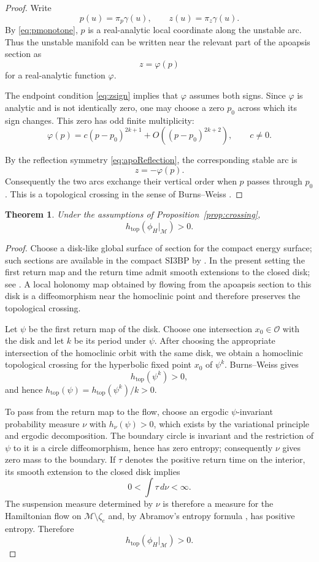 \documentclass[11pt]{article}
\newtheorem{theorem}{Theorem}[section]
\newcommand{\cM}{\mathcal M}
\newcommand{\cO}{\mathcal O}
\newcommand{\htop}{h_{\mathrm{top}}}
\begin{document}
\begin{proof}
Write
\[
 p(u)=\pi_p\gamma(u),\qquad
 z(u)=\pi_z\gamma(u).
\]
By \eqref{eq:pmonotone}, $p$ is a real-analytic local coordinate along the
unstable arc.  Thus the unstable manifold can be written near the relevant
part of the apoapsis section as
\[
 z=\varphi(p)
\]
for a real-analytic function $\varphi$.

The endpoint condition \eqref{eq:zsign} implies that $\varphi$ assumes both
signs.  Since $\varphi$ is analytic and is not identically zero, one may
choose a zero $p_0$ across which its sign changes.  This zero has odd finite
multiplicity:
\[
 \varphi(p)
 =
 c(p-p_0)^{2k+1}
 +O((p-p_0)^{2k+2}),
 \qquad c\ne0.
\]

By the reflection symmetry \eqref{eq:apoReflection}, the corresponding
stable arc is
\[
 z=-\varphi(p).
\]
Consequently the two arcs exchange their vertical order when $p$ passes
through $p_0$.  This is a topological crossing in the sense of
Burns--Weiss \cite{BurnsWeiss}.
\end{proof}

\begin{theorem}\label{thm:entropyfromcrossing}
Under the assumptions of Proposition~\ref{prop:crossing},
\[
 \htop(\phi_H|_{\cM})>0.
\]
\end{theorem}

\begin{proof}
Choose a disk-like global surface of section for the compact energy
surface; such sections are available in the compact SI3BP by
\cite{HuLiuOuSalomaoYu}.  In the present setting the first return map and the
return time admit smooth extensions to the closed disk; see
\cite[Propositions~4.1--4.2]{ECHconstraints}.  A local holonomy map obtained
by flowing from the apoapsis section to this disk is a diffeomorphism near
the homoclinic point and therefore preserves the topological crossing.

Let $\psi$ be the first return map of the disk.  Choose one intersection
$x_0\in\cO$ with the disk and let $k$ be its period under $\psi$.  After
choosing the appropriate intersection of the homoclinic orbit with the same
disk, we obtain a homoclinic topological crossing for the hyperbolic fixed
point $x_0$ of $\psi^k$.  Burns--Weiss \cite{BurnsWeiss} gives
\[
 \htop(\psi^k)>0,
\]
and hence $\htop(\psi)=\htop(\psi^k)/k>0$.

To pass from the return map to the flow, choose an ergodic
$\psi$-invariant probability measure $\nu$ with $h_\nu(\psi)>0$, which
exists by the variational principle and ergodic decomposition.  The boundary
circle is invariant and the restriction of $\psi$ to it is a circle
diffeomorphism, hence has zero entropy; consequently $\nu$ gives zero mass to
the boundary.  If $\tau$ denotes the positive return time on the interior,
its smooth extension to the closed disk implies
\[
 0<\int\tau\,d\nu<\infty.
\]
The suspension measure determined by $\nu$ is therefore a measure for the
Hamiltonian flow on $\cM\setminus\zeta_e$ and, by Abramov's entropy formula
\cite{Abramov}, has positive entropy.  Therefore
\[
 \htop(\phi_H|_{\cM})>0.
\]
\end{proof}
\end{document}
